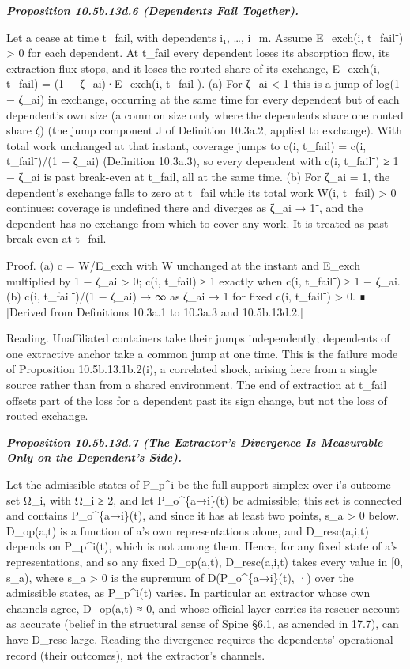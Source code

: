 \documentclass[
]{article}
\begin{document}
\emph{\textbf{Proposition 10.5b.13d.6 (Dependents Fail Together).}}

Let a cease at time t\_fail, with dependents i₁, \ldots, i\_m. Assume
E\_exch(i, t\_fail⁻) \textgreater{} 0 for each dependent. At t\_fail
every dependent loses its absorption flow, its extraction flux stops,
and it loses the routed share of its exchange, E\_exch(i, t\_fail) = (1
− ζ\_ai)·E\_exch(i, t\_fail⁻). (a) For ζ\_ai \textless{} 1 this is a
jump of log(1 − ζ\_ai) in exchange, occurring at the same time for every
dependent but of each dependent's own size (a common size only where the
dependents share one routed share ζ) (the jump component J of Definition
10.3a.2, applied to exchange). With total work unchanged at that
instant, coverage jumps to c(i, t\_fail) = c(i, t\_fail⁻)/(1 − ζ\_ai)
(Definition 10.3a.3), so every dependent with c(i, t\_fail⁻) ≥ 1 − ζ\_ai
is past break-even at t\_fail, all at the same time. (b) For ζ\_ai = 1,
the dependent's exchange falls to zero at t\_fail while its total work
W(i, t\_fail) \textgreater{} 0 continues: coverage is undefined there
and diverges as ζ\_ai → 1⁻, and the dependent has no exchange from which
to cover any work. It is treated as past break-even at t\_fail.

Proof. (a) c = W/E\_exch with W unchanged at the instant and E\_exch
multiplied by 1 − ζ\_ai \textgreater{} 0; c(i, t\_fail) ≥ 1 exactly when
c(i, t\_fail⁻) ≥ 1 − ζ\_ai. (b) c(i, t\_fail⁻)/(1 − ζ\_ai) → ∞ as ζ\_ai
→ 1 for fixed c(i, t\_fail⁻) \textgreater{} 0. ∎ {[}Derived from
Definitions 10.3a.1 to 10.3a.3 and 10.5b.13d.2.{]}

Reading. Unaffiliated containers take their jumps independently;
dependents of one extractive anchor take a common jump at one time. This
is the failure mode of Proposition 10.5b.13.1b.2(i), a correlated shock,
arising here from a single source rather than from a shared environment.
The end of extraction at t\_fail offsets part of the loss for a
dependent past its sign change, but not the loss of routed exchange.

\emph{\textbf{Proposition 10.5b.13d.7 (The Extractor's Divergence Is
Measurable Only on the Dependent's Side).}}

Let the admissible states of P\_p\^{}i be the full-support simplex over
i's outcome set Ω\_i, with \textbar Ω\_i\textbar{} ≥ 2, and let
P\_o\^{}\{a→i\}(t) be admissible; this set is connected and contains
P\_o\^{}\{a→i\}(t), and since it has at least two points, s\_a
\textgreater{} 0 below. D\_op(a,t) is a function of a's own
representations alone, and D\_resc(a,i,t) depends on P\_p\^{}i(t), which
is not among them. Hence, for any fixed state of a's representations,
and so any fixed D\_op(a,t), D\_resc(a,i,t) takes every value in {[}0,
s\_a), where s\_a \textgreater{} 0 is the supremum of
D(P\_o\^{}\{a→i\}(t), ·) over the admissible states, as P\_p\^{}i(t)
varies. In particular an extractor whose own channels agree, D\_op(a,t)
≈ 0, and whose official layer carries its rescuer account as accurate
(belief in the structural sense of Spine §6.1, as amended in 17.7), can
have D\_resc large. Reading the divergence requires the dependents'
operational record (their outcomes), not the extractor's channels.
\end{document}
